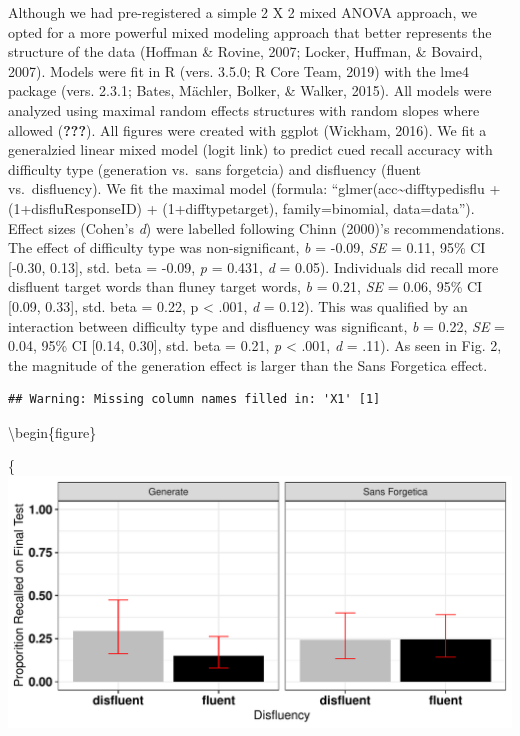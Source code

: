 \documentclass[english,pdf]{apa6}
\begin{document}
Although we had pre-registered a simple 2 X 2 mixed ANOVA approach, we opted for a more powerful mixed modeling approach that better represents the structure of the data (Hoffman \& Rovine, 2007; Locker, Huffman, \& Bovaird, 2007). Models were fit in R (vers. 3.5.0; R Core Team, 2019) with the lme4 package (vers. 2.3.1; Bates, Mächler, Bolker, \& Walker, 2015). All models were analyzed using maximal random effects structures with random slopes where allowed ({\textbf{???}}). All figures were created with ggplot (Wickham, 2016). We fit a generalzied linear mixed model (logit link) to predict cued recall accuracy with difficulty type (generation vs.~sans forgetcia) and disfluency (fluent vs.~disfluency). We fit the maximal model (formula: \enquote{glmer(acc\textasciitilde{}difftypedisflu + (1+disflu\textbar{}ResponseID) + (1+difftype\textbar{}target), family=binomial, data=data}). Effect sizes (Cohen's \emph{d}) were labelled following Chinn (2000)'s recommendations. The effect of difficulty type was non-significant, \emph{b} = -0.09, \emph{SE} = 0.11, 95\% CI {[}-0.30, 0.13{]}, std. beta = -0.09, \emph{p} = 0.431, \emph{d} = 0.05). Individuals did recall more disfluent target words than fluney target words, \emph{b} = 0.21, \emph{SE} = 0.06, 95\% CI {[}0.09, 0.33{]}, std. beta = 0.22, p \textless{} .001, \emph{d} = 0.12). This was qualified by an interaction between difficulty type and disfluency was significant, \emph{b} = 0.22, \emph{SE} = 0.04, 95\% CI {[}0.14, 0.30{]}, std. beta = 0.21, \emph{p} \textless{} .001, \emph{d} = .11). As seen in Fig. 2, the magnitude of the generation effect is larger than the Sans Forgetica effect.

\begin{verbatim}
## Warning: Missing column names filled in: 'X1' [1]
\end{verbatim}

\textbackslash{}begin\{figure\}

\{\centering \includegraphics{SF_Paper_files/figure-latex/unnamed-chunk-2-1}
\end{document}
